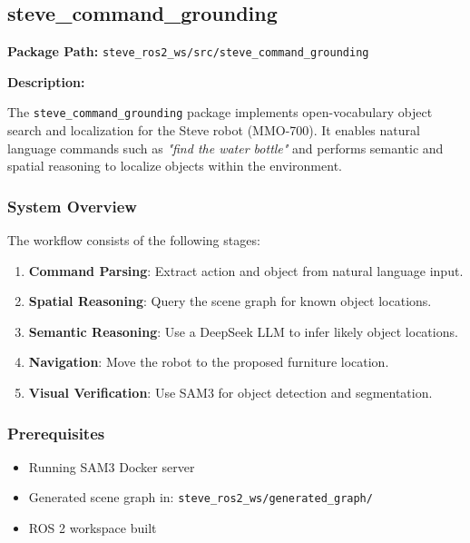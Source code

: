 \documentclass[12pt,oneside,a4paper]{article}
\begin{document}
\subsection{steve\_command\_grounding}
\label{subsec:steve_command_grounding}

\textbf{Package Path:} \texttt{steve\_ros2\_ws/src/steve\_command\_grounding}

\textbf{Description:}

The \texttt{steve\_command\_grounding} package implements open-vocabulary object search and localization for the Steve robot (MMO-700). It enables natural language commands such as \textit{"find the water bottle"} and performs semantic and spatial reasoning to localize objects within the environment.

\subsubsection{System Overview}

The workflow consists of the following stages:
\begin{enumerate}
    \item \textbf{Command Parsing}: Extract action and object from natural language input.
    \item \textbf{Spatial Reasoning}: Query the scene graph for known object locations.
    \item \textbf{Semantic Reasoning}: Use a DeepSeek LLM to infer likely object locations.
    \item \textbf{Navigation}: Move the robot to the proposed furniture location.
    \item \textbf{Visual Verification}: Use SAM3 for object detection and segmentation.
\end{enumerate}

\subsubsection{Prerequisites}

\begin{itemize}
    \item Running SAM3 Docker server
    \item Generated scene graph in: \texttt{steve\_ros2\_ws/generated\_graph/}
    \item ROS 2 workspace built
\end{itemize}
\end{document}
